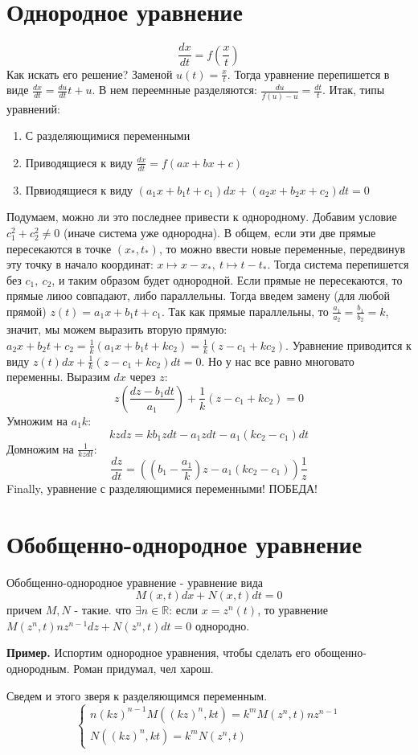 \section{Однородное уравнение}
$$\frac{dx}{dt}=f(\frac{x}{t})$$ 
Как искать его решение? Заменой $u(t)=\frac{x}{t}$. 
Тогда уравнение перепишется в виде $\frac{dx}{dt}=\frac{du}{dt}t+u$.
В нем переемнные разделяются: $\frac{du}{f(u)-u}=\frac{dt}{t}$. 
Итак, типы уравнений:
\begin{enumerate}
    \item С разделяющимися переменными
    \item Приводящиеся к виду $\frac{dx}{dt}=f(ax+bx+c)$ 
    \item Првиодящиеся к виду $(a_1x+b_1t+c_1)dx+(a_2x+b_2x+c_2)dt=0$
\end{enumerate}
Подумаем, можно ли это последнее привести к однородному. Добавим условие 
$c_1^2+c_2^2\ne0$ (иначе система уже однородна). В общем, если эти 
две прямые пересекаются в точке
$(x_*,t_*)$, то можно ввести новые переменные, передвинув эту точку в начало
координат: $x\mapsto x-x_*,~t\mapsto t-t_*$. Тогда система перепишется 
без $c_1,~c_2$, и таким образом будет однородной. Если прямые не пересекаются, 
то прямые лиюо совпадают, либо параллельны. Тогда введем замену (для любой 
прямой) $z(t)=a_1x+b_1t+c_1$. Так как прямые параллельны, то
$\frac{a_1}{a_2}=\frac{b_1}{b_2}=k$, значит, мы можем выразить 
вторую прямую: $a_2x+b_2t+c_2=\frac{1}{k}(a_1x+b_1t+kc_2)=\frac{1}{k}(z-
c_1+kc_2)$. Уравнение приводится к виду $z(t)dx+\frac{1}{k}(z-c_1+kc_2)dt=0$.
Но у нас все равно многовато переменны. Выразим $dx$ через  $z$:
$$z(\frac{dz-b_1dt}{a_1})+\frac{1}{k}(z-c_1+kc_2)=0$$ 
Умножим на $a_1k$:
 $$kzdz=kb_1zdt-a_1zdt-a_1(kc_2-c_1)dt$$ 
Домножим на $\frac{1}{kzdt}$:
$$\frac{dz}{dt}=((b_1-\frac{a_1}{k})z-a_1(kc_2-c_1))\frac{1}{z}$$ 
Finally, уравнение с разделяющимися переменными! ПОБЕДА!
\section{Обобщенно-однородное уравнение}
\begin{defin}
Обобщенно-однородное уравнение - уравнение вида
$$M(x,t)dx+N(x,t)dt=0$$ 
причем $M,N$ - такие. что  $\exists n\in\mathbb{R}$: если
$x=z^n(t)$, то уравнение  $M(z^n,t)nz^{n-1}dz+N(z^n,t)dt=0$ однородно.
\end{defin}
\textbf{Пример.} Испортим однородное уравнения, чтобы сделать его 
обощенно-однородным. Роман придумал, чел харош.

Сведем и этого зверя к разделяющимся переменным. 
$$\begin{cases}
    n(kz)^{n-1}M((kz)^n,kt)=k^mM(z^n,t)nz^{n-1}\\
    N((kz)^n,kt)=k^mN(z^n,t)
\end{cases}$$ 

